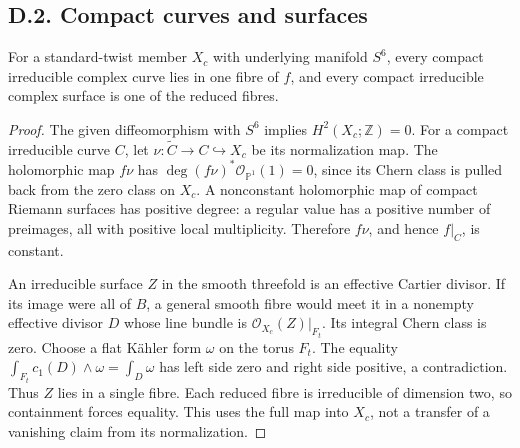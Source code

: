 \subsection{D.2. Compact curves and surfaces}
\begin{proposition}\label{fam:src:D.2.1}\label{fam:st:D.2.1}
For a standard-twist member \(X_c\) with underlying manifold \(S^6\),
every compact irreducible complex curve lies in one fibre of \(f\), and
every compact irreducible complex surface is one of the reduced fibres.
\end{proposition}
\begin{proof}
The given diffeomorphism with \(S^6\) implies \(H^2(X_c;\mathbb Z)=0\).
For a compact irreducible curve \(C\), let
\(\nu:\widetilde C\to C\hookrightarrow X_c\) be its normalization map.
The holomorphic map \(f\nu\) has
\(\deg (f\nu)^*\mathcal O_{\mathbb P^1}(1)=0\), since its Chern class is
pulled back from the zero class on \(X_c\). A nonconstant holomorphic map
of compact Riemann surfaces has positive degree: a regular value has a
positive number of preimages, all with positive local multiplicity.
Therefore \(f\nu\), and hence \(f|_C\), is constant.

An irreducible surface \(Z\) in the smooth threefold is an effective
Cartier divisor. If its image were all of \(B\), a general smooth fibre
would meet it in a nonempty effective divisor \(D\) whose line bundle
is \(\mathcal O_{X_c}(Z)|_{F_t}\). Its integral Chern class is zero.
Choose a flat K\"ahler form \(\omega\) on the torus \(F_t\). The equality
\(\int_{F_t}c_1(D)\wedge\omega=\int_D\omega\) has left side zero and right
side positive, a contradiction. Thus \(Z\) lies in a single fibre.
Each reduced fibre is irreducible of dimension two, so containment forces
equality. This uses the full map into \(X_c\), not a transfer of a
vanishing claim from its normalization.
\end{proof}

